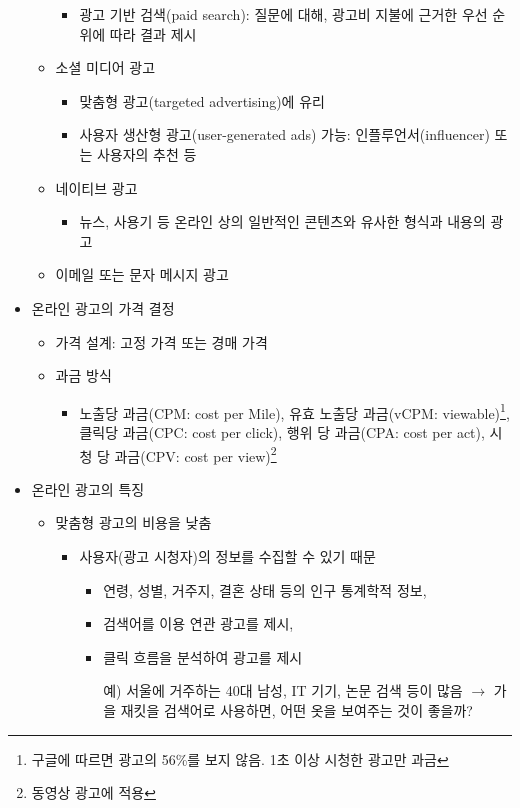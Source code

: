\begin{itemize}
\begin{itemize}
\begin{itemize}
		\item 광고 기반 검색(paid search): 질문에 대해, 광고비 지불에 근거한 우선 순위에 따라 결과 제시
		\end{itemize}
	\item 소셜 미디어 광고
		\begin{itemize}
		\item 맞춤형 광고(targeted advertising)에 유리
		\item 사용자 생산형 광고(user-generated ads) 가능: 인플루언서(influencer) 또는 사용자의 추천 등
		\end{itemize}
	\item 네이티브 광고
		\begin{itemize}
		\item 뉴스, 사용기 등 온라인 상의 일반적인 콘텐츠와 유사한 형식과 내용의 광고
		\end{itemize}
	\item 이메일 또는 문자 메시지 광고
	\end{itemize}
\item 온라인 광고의 가격 결정
	\begin{itemize}
	\item 가격 설계: 고정 가격 또는 경매 가격 
	\item 과금 방식
		\begin{itemize}
		\item 노출당 과금(CPM: cost per Mile), 유효 노출당 과금(vCPM: viewable)\footnote{구글에 따르면 광고의 56\%를 보지 않음. 1초 이상 시청한 광고만 과금}, 클릭당 과금(CPC: cost per click), 행위 당 과금(CPA: cost per act), 시청 당 과금(CPV: cost per view)\footnote{동영상 광고에 적용}	
		\end{itemize}
	\end{itemize}
\item 온라인 광고의 특징 \citep{Evans:2009aa, Goldfarb:2014aa}
	\begin{itemize}
	\item 맞춤형 광고의 비용을 낮춤
		\begin{itemize}
		\item 사용자(광고 시청자)의 정보를 수집할 수 있기 때문
			\begin{itemize}
			\item 연령, 성별, 거주지, 결혼 상태 등의 인구 통계학적 정보,
			\item 검색어를 이용 연관 광고를 제시,
			\item 클릭 흐름을 분석하여 광고를 제시 
			\item[예)] 서울에 거주하는 40대 남성, IT 기기, 논문 검색 등이 많음 $\rightarrow$ 가을 재킷을 검색어로 사용하면, 어떤 옷을 보여주는 것이 좋을까?

\end{itemize}
\end{itemize}
\end{itemize}
\end{itemize}
